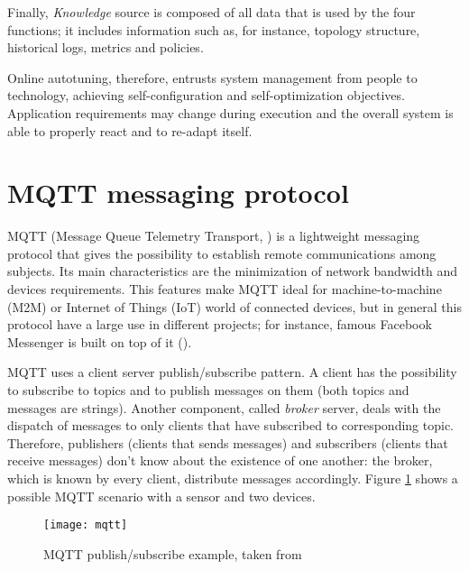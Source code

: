 Finally, \textit{Knowledge} source is composed of all data that is used by the four functions; it includes information such as, for instance, topology structure, historical logs, metrics and policies.

Online autotuning, therefore, entrusts system management from people to technology, achieving self-configuration and self-op\-ti\-mi\-za\-tion objectives. Application requirements may change during execution and the overall system is able to properly react and to re-adapt itself.





\section{MQTT messaging protocol}\label{mqtt}

MQTT (Message Queue Telemetry Transport, \cite{banks2014mqtt}) is a light\-weight messaging protocol that gives the possibility to establish remote communications among subjects. Its main characteristics are the minimization of network bandwidth and devices requirements. This features make MQTT ideal for machine-to-machine (M2M) or Internet of Things (IoT) world of connected devices, but in general this protocol have a large use in different projects; for instance, famous Facebook Messenger is built on top of it (\cite{zhang2011building}).

MQTT uses a client server publish\slash{}subscribe pattern. A client has the possibility to subscribe to topics and to publish messages on them (both topics and messages are strings). Another component, called \textit{broker} server, deals with the dispatch of messages to only clients that have subscribed to corresponding topic. Therefore, publishers (clients that sends messages) and subscribers (clients that receive messages) don't know about the existence of one another: the broker, which is known by every client, distribute messages accordingly. Figure \ref{fig::mqtt_example} shows a possible MQTT scenario with a sensor and two devices.

\begin{figure}[htb]

    \centering
    \texttt{[image: mqtt]}
    \caption[MQTT publish/subscribe example]{MQTT publish/subscribe example, taken from \cite{site:hivemq}}
    \label{fig::mqtt_example}

\end{figure}

